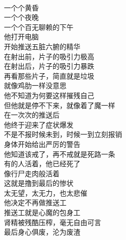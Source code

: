 \begin{poem}[推送工]
    \begin{multicols}{2}
        \begin{center}~\\
            一个个黄昏 \\ 一个个夜晚 \\ 一个个百无聊赖的下午 \\ 他打开电脑 \\ 开始推送五脏六腑的精华 \\ 在射出前，片子的吸引力极高 \\ 在射出后，片子的吸引力暴跌 \\ 再看那些片子，简直就是垃圾 \\ 就像鸡肋一样没意思 \\ 他不知道为何要这样摧残自己 \\ 但他就是停不下来，就像着了魔一样 \\ 在一次次的推送后 \\ 他终于迎来了症状爆发 \\ 不是不报时候未到，时候一到立刻报销 \\ 身体开始给出严厉的警告 \\ 他知道该戒了，再不戒就是死路一条 \\ 有的人活着，他已经死了 \\ 像行尸走肉般活着 \\ 这就是撸到最后的惨状 \\ 太无望，太无力，也太悲催 \\ 他决定不再做推送工 \\ 推送工就是心魔的包身工 \\ 肾精被残酷压榨，毫无自由可言 \\ 最后身心俱废，沦为废渣
        \end{center}
    \end{multicols}
\end{poem}

